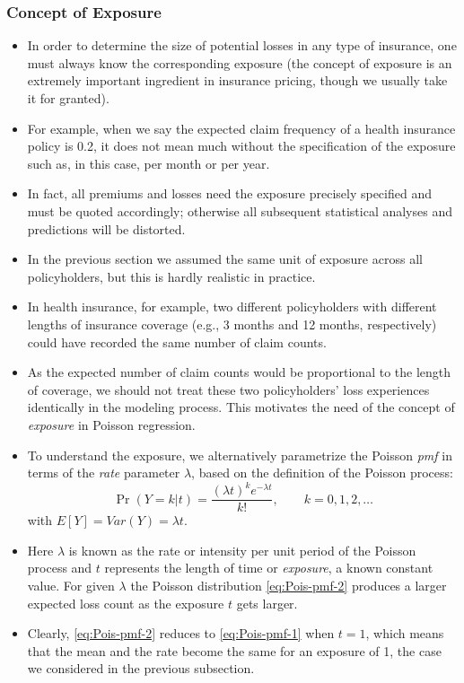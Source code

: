 \documentclass[ignorenonframetext,]{beamer}
\begin{document}
\begin{frame}[allowframebreaks]
\frametitle{Concept of Exposure}

\begin{itemize}
\item In order to determine the size of potential losses in any type of insurance, one must always know the corresponding exposure (the concept of exposure is an extremely important ingredient in insurance pricing, though we usually take it for granted).
\item For example, when we say the expected  claim frequency of a health insurance policy is 0.2, it does not mean much without the specification of the exposure such as, in this case, per month or per year. 
\item In fact, all premiums and losses need the exposure precisely specified and must be quoted accordingly; otherwise all subsequent statistical analyses and predictions will be distorted.  
\item In the previous section we assumed the same unit of exposure across all policyholders, but this is hardly realistic in practice. 
\item In health insurance, for example, two different policyholders with different lengths of insurance coverage (e.g., 3 months and 12 months, respectively) could have recorded the same number of claim counts. 
\item As the expected number of claim counts would be proportional to the length of coverage, we should not treat these two policyholders' loss experiences identically in the modeling process. This motivates the need of the concept of \emph{exposure} in Poisson regression.  

\item To understand the exposure, we alternatively parametrize the Poisson \emph{pmf} in terms of the \emph{rate} parameter $\lambda$, based on the definition of the Poisson process:
\begin{equation} \label{eq:Pois-pmf-2}
\Pr(Y=k|t)=\frac{(\lambda t)^k e^{-\lambda t}}{k!},\qquad k=0,1,2, \ldots
\end{equation}
with $E[Y]=Var(Y)=\lambda t$. 
\item Here $\lambda$ is known as the rate or intensity per unit period of the Poisson process and $t$ represents the length of time or \emph{exposure}, a known constant value. For given $\lambda$ the Poisson distribution \eqref{eq:Pois-pmf-2} produces a larger expected loss count  as the exposure $t$ gets larger. 
\item Clearly, \eqref{eq:Pois-pmf-2} reduces to \eqref{eq:Pois-pmf-1} when $t=1$, which means that the mean and the rate become the same for an exposure of 1, the case we considered in the previous subsection.  
\end{itemize}


\end{frame}
\end{document}
